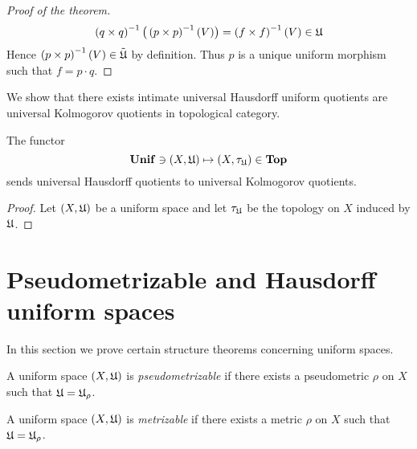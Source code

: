 \begin{proof}[Proof of the theorem]
$$\left(q\times q\right)^{-1}\big(\left(p\times p\right)^{-1}(V)\big) = \left(f\times f\right)^{-1}(V) \in {\mathfrak U}$$
Hence $\left(p\times p\right)^{-1}(V) \in \tilde{{\mathfrak U}}$ by definition. Thus $p$ is a unique uniform morphism such that $f = p\cdot q$.
\end{proof}
\noindent
We show that there exists intimate universal Hausdorff uniform quotients are universal Kolmogorov quotients in topological category.

\begin{proposition}\label{proposition:universal_Hausdordff_quotients_are_universal_Kolmogorov_quotients}
The functor
$$\mathbf{Unif} \ni (X,{\mathfrak U}) \mapsto (X,\tau_{{\mathfrak U}}) \in \mathbf{Top}$$
sends universal Hausdorff quotients to universal Kolmogorov quotients.
\end{proposition}
\begin{proof}
Let $(X,{\mathfrak U})$ be a uniform space and let $\tau_{{\mathfrak U}}$ be the topology on $X$ induced by ${\mathfrak U}$.
\end{proof}



\section{Pseudometrizable and Hausdorff uniform spaces}
\noindent
In this section we prove certain structure theorems concerning uniform spaces. 



\begin{definition}
A uniform space $(X,{\mathfrak U})$ is \textit{pseudometrizable} if there exists a pseudometric $\rho$ on $X$ such that ${\mathfrak U} = {\mathfrak U}_{\rho}$.
\end{definition}

\begin{definition}
A uniform space $(X,{\mathfrak U})$ is \textit{metrizable} if there exists a metric $\rho$ on $X$ such that ${\mathfrak U} = {\mathfrak U}_{\rho}$.
\end{definition}



